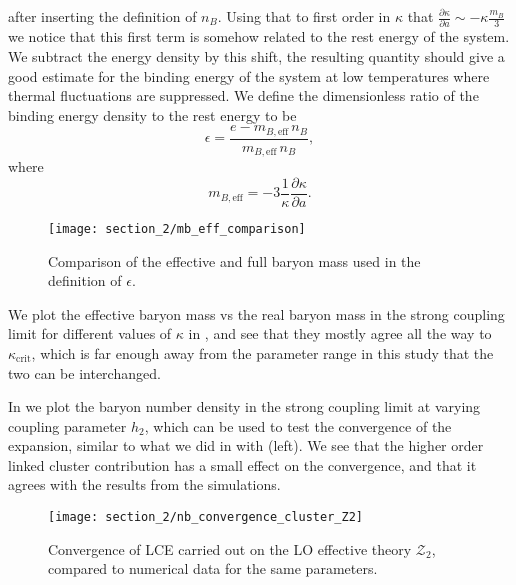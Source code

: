 %
after inserting the definition of $n_B$. Using that to first order in $\kappa$
that $\frac{\partial \kappa}{\partial a} \sim \minus{}\kappa \frac{m_B}{3}$ we notice that
this first term is somehow related to the rest energy of the system. We subtract
the energy density by this shift, the resulting quantity should give a good estimate for the
binding energy of the system at low temperatures where thermal fluctuations are
suppressed. We define the dimensionless ratio of the binding energy density to
the rest energy to be
%
\begin{equation} \label{eq:epsilon_definition}
  \epsilon = \frac{e - m_{B,\text{eff}}\, n_B}{m_{B,\text{eff}}\, n_B},
\end{equation}
%
where
%
\begin{equation}
  m_{B,\text{eff}} = -3 \frac{1}{\kappa} \frac{\partial \kappa}{\partial a}.
\end{equation}
%
\begin{figure}[t]%
  {\centering%
    \texttt{[image: section\_2/mb\_eff\_comparison]}\par}
  \caption{Comparison of the effective and full baryon mass used in the definition of $\epsilon$.}%
  \label{fig:mb_eff_comparison}%
\end{figure}%
%
We plot the effective baryon mass vs the real baryon mass in the strong coupling
limit for different values of $\kappa$ in , and
see that they mostly agree all the way to $\kappa_{\mathrm{crit}}$, which is far
enough away from the parameter range in this study that the two can be
interchanged.

In  we plot the baryon number density in the
strong coupling limit at varying coupling parameter $h_2$, which can be used to
test the convergence of the expansion, similar to what we did in 
with  (left). We see that the higher order
linked cluster contribution has a small effect on the convergence, and that it
agrees with the results from the simulations.

\begin{figure}
  \begin{center}
    \texttt{[image: section\_2/nb\_convergence\_cluster\_Z2]}
  \end{center}
  \caption{Convergence of LCE carried out on the LO effective theory
    $\mathcal{Z}_2$, compared to numerical data for the same parameters.}
  \label{fig:convergence_cluster_Z2}
\end{figure}

